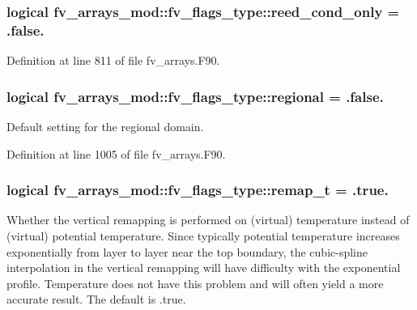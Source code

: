 \subsubsection[{reed\-\_\-cond\-\_\-only}]{\setlength{\rightskip}{0pt plus 5cm}logical fv\-\_\-arrays\-\_\-mod\-::fv\-\_\-flags\-\_\-type\-::reed\-\_\-cond\-\_\-only = .false.}\label{structfv__arrays__mod_1_1fv__flags__type_a1ce5860dce6be701f06ad37631322dca}


Definition at line 811 of file fv\-\_\-arrays.\-F90.

\subsubsection[{regional}]{\setlength{\rightskip}{0pt plus 5cm}logical fv\-\_\-arrays\-\_\-mod\-::fv\-\_\-flags\-\_\-type\-::regional = .false.}\label{structfv__arrays__mod_1_1fv__flags__type_a4ce53164805b0d12f7f4f44ca7dc8baf}


Default setting for the regional domain. 



Definition at line 1005 of file fv\-\_\-arrays.\-F90.

\subsubsection[{remap\-\_\-t}]{\setlength{\rightskip}{0pt plus 5cm}logical fv\-\_\-arrays\-\_\-mod\-::fv\-\_\-flags\-\_\-type\-::remap\-\_\-t = .true.}\label{structfv__arrays__mod_1_1fv__flags__type_a78ac3950ee46ddf7487ff9abe7599b70}


Whether the vertical remapping is performed on (virtual) temperature instead of (virtual) potential temperature. Since typically potential temperature increases exponentially from layer to layer near the top boundary, the cubic-\/spline interpolation in the vertical remapping will have difficulty with the exponential profile. Temperature does not have this problem and will often yield a more accurate result. The default is .true. 



